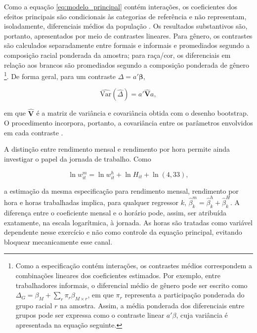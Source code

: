 \documentclass[12pt]{article}
\begin{document}
Como a equação \eqref{eq:modelo_principal} contém interações, os coeficientes dos
efeitos principais são condicionais às categorias de referência e não
representam, isoladamente, diferenciais médios da população
\citep{brambor2006understanding}. Os resultados substantivos são, portanto,
apresentados por meio de contrastes lineares. Para gênero, os contrastes são
calculados separadamente entre formais e informais e promediados segundo a composição racial 
ponderada da amostra; para raça/cor, os diferenciais em
relação aos brancos são promediados segundo a composição ponderada de gênero
\footnote{Como a especificação contém interações, os contrastes médios 
correspondem a combinações lineares dos coeficientes estimados. Por exemplo, 
entre trabalhadores informais, o diferencial médio de gênero pode ser escrito
como $\Delta_G=\beta_M+\sum_r \pi_r\beta_{M\times r}$,
em que $\pi_r$ representa a participação ponderada do grupo racial $r$ na amostra.
Assim, a média ponderada dos diferenciais entre grupos pode ser expressa como o 
contraste linear $a'\beta$, cuja variância é apresentada na equação seguinte.}. De
forma geral, para um contraste $\Delta=a'\boldsymbol{\beta}$,

\begin{equation}
    \widehat{\mathrm{Var}}(\widehat{\Delta})
    =
    a'\widehat{\mathbf V}a,
    \label{eq:contraste}
\end{equation}

\noindent
em que $\widehat{\mathbf V}$ é a matriz de variância e covariância obtida com o
desenho bootstrap. O procedimento incorpora, portanto, a covariância entre os
parâmetros envolvidos em cada contraste \citep{lumley2010complex}.

A distinção entre rendimento mensal e rendimento por hora permite ainda
investigar o papel da jornada de trabalho. Como

\begin{equation}
    \ln w^m_{it}
    =
    \ln w^h_{it}
    +
    \ln H_{it}
    +
    \ln(4{,}33),
    \label{eq:identidade_jornada}
\end{equation}

\noindent
a estimação da mesma especificação para rendimento mensal, rendimento por hora
e horas trabalhadas implica, para qualquer regressor $k$,
$\widehat{\beta}^m_k=\widehat{\beta}^h_k+\widehat{\beta}^H_k$. A diferença entre
o coeficiente mensal e o horário pode, assim, ser atribuída exatamente, na
escala logarítmica, à jornada. As horas são tratadas como variável dependente
nesse exercício e não como controle da equação principal, evitando bloquear
mecanicamente esse canal.
\end{document}
